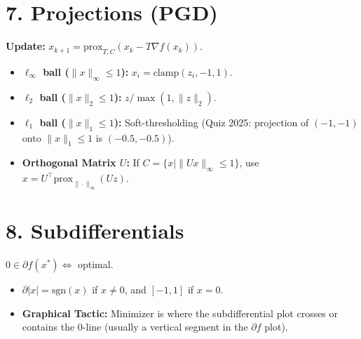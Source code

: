\section{7. Projections (PGD)}
\textbf{Update:} $x_{k+1} = \text{prox}_{T, C}(x_k - T \nabla f(x_k))$.
\begin{itemize}[leftmargin=*]
  \item \textbf{$\ell_\infty$ ball ($\|x\|_\infty \le 1$):} $x_i =
    \text{clamp}(z_i, -1, 1)$.
  \item \textbf{$\ell_2$ ball ($\|x\|_2 \le 1$):} $z / \max(1, \|z\|_2)$.
  \item \textbf{$\ell_1$ ball ($\|x\|_1 \le 1$):} Soft-thresholding
    (Quiz 2025: projection of $(-1,-1)$ onto $\|x\|_1 \le 1$ is $(-0.5, -0.5)$).
  \item \textbf{Orthogonal Matrix $U$:} If $C = \{x \mid
    \|Ux\|_\infty \le 1\}$, use $x = U^\top \text{prox}_{\|\cdot\|_\infty}(Uz)$.
\end{itemize}

\section{8. Subdifferentials}
$0 \in \partial f(x^*) \iff$ optimal.
\begin{itemize}[leftmargin=*]
  \item $\partial |x| = \text{sgn}(x)$ if $x \neq 0$, and $[-1, 1]$ if $x=0$.
  \item \textbf{Graphical Tactic:} Minimizer is where the
    subdifferential plot crosses or contains the 0-line (usually a
    vertical segment in the $\partial f$ plot).
\end{itemize}

